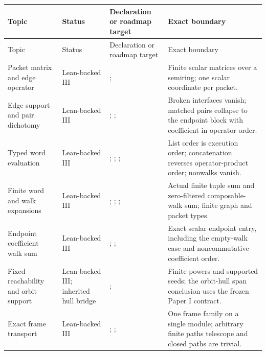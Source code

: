\small
\begin{longtable}{L{0.17\textwidth}L{0.18\textwidth}L{0.25\textwidth}L{0.22\textwidth}}
\toprule
Topic & Status & Declaration or roadmap target & Exact boundary\\
\midrule
\endfirsthead
\toprule
Topic & Status & Declaration or roadmap target & Exact boundary\\
\midrule
\endhead
Packet matrix and edge operator
& Lean-backed III
& ; 
& Finite scalar matrices over a semiring; one scalar coordinate per packet.\\
\addlinespace
Edge support and pair dichotomy
& Lean-backed III
& ; ; 
& Broken interfaces vanish; matched pairs collapse to the endpoint block with coefficient in operator order.\\
\addlinespace
Typed word evaluation
& Lean-backed III
& ; ; ; 
& List order is execution order; concatenation reverses operator-product order; nonwalks vanish.\\
\addlinespace
Finite word and walk expansions
& Lean-backed III
& ; ; ; 
& Actual finite tuple sum and zero-filtered composable-walk sum; finite graph and packet types.\\
\addlinespace
Endpoint coefficient walk sum
& Lean-backed III
& ; ; 
& Exact scalar endpoint entry, including the empty-walk case and noncommutative coefficient order.\\
\addlinespace
Fixed reachability and orbit support
& Lean-backed III; inherited hull bridge
& ; 
& Finite powers and supported seeds; the orbit-hull span conclusion uses the frozen Paper I contract.\\
\addlinespace
Exact frame transport
& Lean-backed III
& ; ; 
& One frame family on a single module; arbitrary finite paths telescope and closed paths are trivial.\\

\end{longtable}

